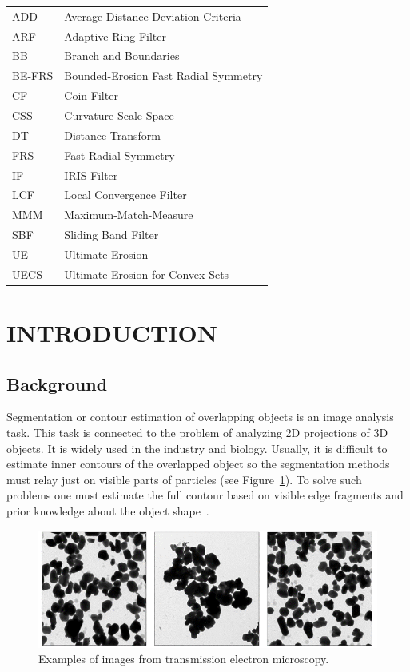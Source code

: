 \documentclass{lutmscthesis}[2010/09/22]
\begin{document}
\begin{tabular}{l l}
ADD &  Average Distance Deviation Criteria\\
ARF & Adaptive Ring Filter\\
BB & Branch and Boundaries\\
BE-FRS & Bounded-Erosion Fast Radial Symmetry\\
CF & Coin Filter\\
CSS & Curvature Scale Space \\
DT & Distance Transform \\
FRS & Fast Radial Symmetry \\
IF & IRIS Filter\\
LCF & Local Convergence Filter\\
MMM & Maximum-Match-Measure\\
SBF & Sliding Band Filter\\
UE & Ultimate Erosion\\
UECS & Ultimate Erosion for Convex Sets\\
\end{tabular}



\setlength{\parskip}{3ex}



\section{INTRODUCTION}
\label{sec:introduction}

\subsection{Background}
\label{sec:background}

Segmentation or contour estimation of overlapping objects is an image analysis task. This task is connected to the problem of analyzing 2D projections of 3D objects. It is widely used in the industry and biology. Usually, it is difficult to estimate inner contours of the overlapped object so the segmentation methods must relay just on visible parts of particles (see Figure~\ref{fig:real_data}). To solve such problems one must estimate the full contour based on visible edge fragments and prior knowledge about the object shape~\cite{zafari-thesis}.

\begin{figure}[ht]
  \includegraphics[width=\linewidth]{real_data.png}
  \caption{Examples of images from transmission electron microscopy.~\cite{zafari2017comparison}}
  \label{fig:real_data}
\end{figure}
\end{document}
